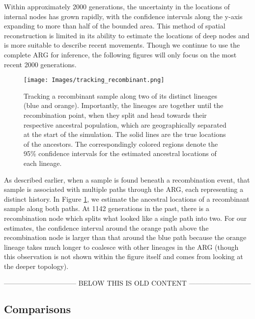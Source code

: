  Within approximately 2000 generations, the uncertainty in the locations of internal nodes has grown rapidly, with the confidence intervals along the y-axis expanding to more than half of the bounded area. This method of spatial reconstruction is limited in its ability to estimate the locations of deep nodes and is more suitable to describe recent movements. Though we continue to use the complete ARG for inference, the following figures will only focus on the most recent 2000 generations.

\begin{figure}[H]
    \centering
    \texttt{[image: Images/tracking\_recombinant.png]}
    \caption{Tracking a recombinant sample along two of its distinct lineages (blue and orange). Importantly, the lineages are together until the recombination point, when they split and head towards their respective ancestral population, which are geographically separated at the start of the simulation. The solid lines are the true locations of the ancestors. The correspondingly colored regions denote the 95\% confidence intervals for the estimated ancestral locations of each lineage.}
    \label{fig:tracking_recomb_sample}
\end{figure}

As described earlier, when a sample is found beneath a recombination event, that sample is associated with multiple paths through the ARG, each representing a distinct history. In Figure \ref{fig:tracking_recomb_sample}, we estimate the ancestral locations of a recombinant sample along both paths. At 1142 generations in the past, there is a recombination node which splits what looked like a single path into two. For our estimates, the confidence interval around the orange path above the recombination node is larger than that around the blue path because the orange lineage takes much longer to coalesce with other lineages in the ARG (though this observation is not shown within the figure itself and comes from looking at the deeper topology).



\newpage

-------------------------------- BELOW THIS IS OLD CONTENT  --------------------------- \\




\subsection{Comparisons}

